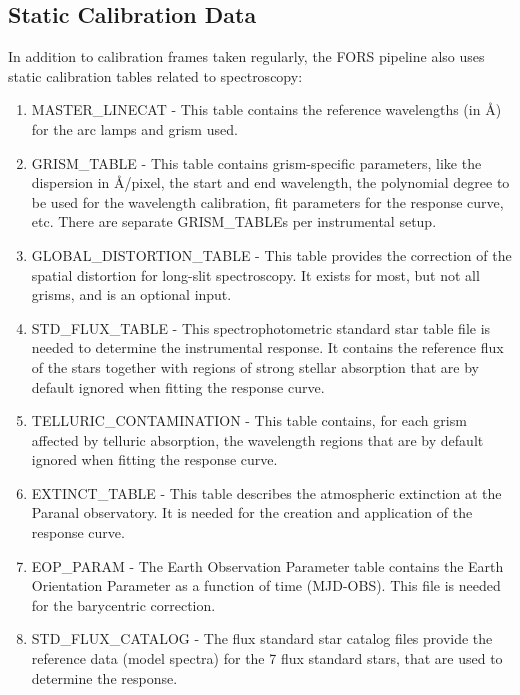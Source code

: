 \subsection{Static Calibration Data}

In addition to calibration frames taken regularly, the FORS pipeline also uses static calibration tables related to spectroscopy:

\begin{enumerate}

\item MASTER\_LINECAT - This table contains the reference wavelengths (in Å) for the arc lamps and grism used.

\item GRISM\_TABLE - This table contains grism-specific parameters, like the dispersion in Å/pixel, the start and end wavelength, the polynomial degree to be used for the wavelength calibration, fit parameters for the response curve, etc. There are separate GRISM\_TABLEs per instrumental setup.

\item GLOBAL\_DISTORTION\_TABLE - This table provides the correction of the spatial distortion for long-slit spectroscopy. It exists for most, but not all grisms, and is an optional input.

\item STD\_FLUX\_TABLE - This spectrophotometric standard star table file is needed to determine the instrumental response. It contains the reference flux of the stars together with regions of strong stellar absorption that are by default ignored when fitting the response curve.

\item TELLURIC\_CONTAMINATION - This table contains, for each grism affected by telluric absorption, the wavelength regions that are by default ignored when fitting the response curve.

\item EXTINCT\_TABLE - This table describes the atmospheric extinction at the Paranal observatory. It is needed for the creation and application of the response curve.

\item EOP\_PARAM - The Earth Observation Parameter table contains the Earth Orientation Parameter as a function of time (MJD-OBS). This file is needed for the barycentric correction. 

\item STD\_FLUX\_CATALOG - The flux standard star catalog files provide the reference data (model spectra) for the 7 flux standard stars, that are used to determine the response.


\end{enumerate}
